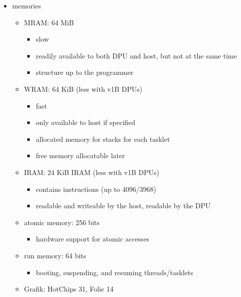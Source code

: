 \begin{itemize}
	\item
	memories
	\begin{itemize}
		\item
		MRAM:
		64 MiB
		\begin{itemize}
			\item
			slow

			\item
			readily available to both DPU and host, but not at the same time

			\item
			structure up to the programmer
		\end{itemize}

		\item
		WRAM:
		64 KiB (less with v1B DPUs)
		\begin{itemize}
			\item
			fast

			\item
			only available to host if specified

			\item
			allocated memory for stacks for each tasklet

			\item
			free memory allocatable later
		\end{itemize}

		\item
		IRAM:
		24 KiB IRAM (less with v1B DPUs)
		\begin{itemize}
			\item
			contains instructions (up to 4096/3968)

			\item
			readable and writeable by the host, readable by the DPU
		\end{itemize}

		\item
		atomic memory:
		256 bits
		\begin{itemize}
			\item
			hardware support for atomic accesses
		\end{itemize}

		\item
		run memory:
		64 bits
		\begin{itemize}
			\item
			booting, suspending, and resuming threads/tasklets
		\end{itemize}

		\item
		Grafik:
		HotChips 31, Folie 14
	\end{itemize}


\end{itemize}
